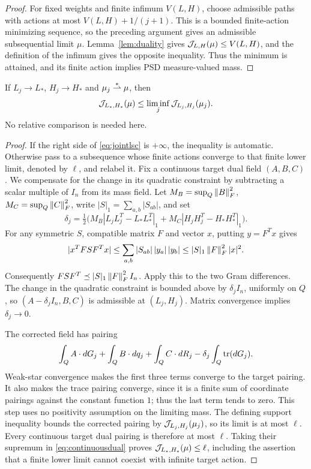 \begin{proof}
For fixed weights and finite infimum $V(L,H)$, choose admissible paths
with actions at most $V(L,H)+1/(j+1)$. This is a bounded finite-action
minimizing sequence, so the preceding argument gives an admissible
subsequential limit $\mu$. Lemma~\ref{lem:duality} gives
$\mathcal J_{L,H}(\mu)\le V(L,H)$, and the definition of the infimum gives the
opposite inequality. Thus the minimum is attained, and its finite action
implies PSD measure-valued mass.
\end{proof}

\begin{lemma}\label{lem:jointlsc}
If $L_j\to L_*$, $H_j\to H_*$ and $\mu_j\overset{*}{\rightharpoonup}\mu$, then
\begin{equation}\label{eq:jointlsc}
 \mathcal J_{L_*,H_*}(\mu)\le\liminf_j\mathcal J_{L_j,H_j}(\mu_j).
\end{equation}
No relative comparison is needed here.
\end{lemma}
\begin{proof}
If the right side of \eqref{eq:jointlsc} is $+\infty$, the inequality is
automatic. Otherwise pass to a subsequence whose finite actions converge to that
finite lower limit, denoted by $\ell$, and relabel it. Fix a continuous
target dual field $(A,B,C)$. We compensate for the change in its quadratic
constraint by subtracting a scalar multiple of $I_n$ from its mass field.
Let $M_B=\sup_Q\left\lVert B\right\rVert_F^2$, $M_C=\sup_Q\left\lVert C\right\rVert_F^2$, write
$|S|_1=\sum_{a,b}|S_{ab}|$, and set
\[
 \delta_j=\tfrac12\bigl(M_B|L_jL_j^T-L_*L_*^T|_1
                  +M_C|H_jH_j^T-H_*H_*^T|_1\bigr).
\]
For any symmetric $S$, compatible matrix $F$ and vector $x$, putting
$y=F^Tx$ gives
\[
 |x^TFSF^Tx|
 \le\sum_{a,b}|S_{ab}|\,|y_a|\,|y_b|
 \le |S|_1\left\lVert F\right\rVert_F^2|x|^2.
\]
Consequently $FSF^T\preceq |S|_1\left\lVert F\right\rVert_F^2I_n$. Apply this to the two
Gram differences. The change in the quadratic constraint is bounded
above by $\delta_jI_n$, uniformly on $Q$, so
$(A-\delta_jI_n,B,C)$ is admissible at $(L_j,H_j)$. Matrix convergence
implies $\delta_j\to0$.

The corrected field has pairing
\[
 \int_Q A\cdot dG_j+\int_Q B\cdot dq_j+\int_Q C\cdot dR_j
       -\delta_j\int_Q\operatorname{tr}(dG_j).
\]
Weak-star convergence makes the first three terms converge to the target
pairing. It also makes the trace pairing converge, since it is a finite
sum of coordinate pairings against the constant function $1$; thus the
last term tends to zero. This step uses no positivity assumption on the
limiting mass. The defining support inequality bounds the corrected
pairing by $\mathcal J_{L_j,H_j}(\mu_j)$, so its limit is at most $\ell$.
Every continuous target dual pairing is therefore at most $\ell$.
Taking their supremum in \eqref{eq:continuousdual} proves
$\mathcal J_{L_*,H_*}(\mu)\le\ell$, including the assertion that a finite
lower limit cannot coexist with infinite target action.
\end{proof}

